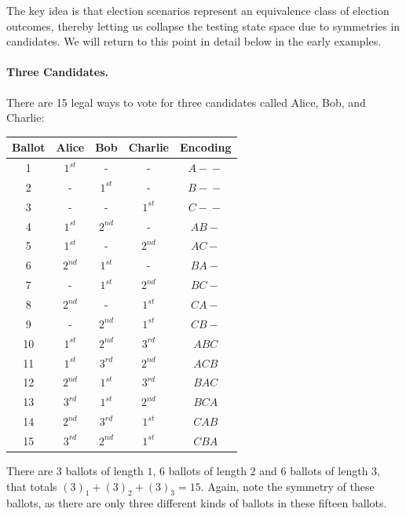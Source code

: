 \documentclass[runningheads,a4paper]{llncs}
\newcommand{\ballotthree}[3]{\ensuremath{\boxed{#1}\boxed{#2}\boxed{#3}}}
\newcommand{\first}{$1^{st}$\xspace}
\newcommand{\second}{$2^{nd}$\xspace}
\newcommand{\third}{$3^{rd}$\xspace}
\begin{document}
The key idea is that election scenarios represent an equivalence class
of election outcomes, thereby letting us collapse the testing state
space due to symmetries in candidates.  We will return to this point
in detail below in the early examples.

\paragraph{Three Candidates.}
There are 15 legal ways to vote for three candidates called Alice,
Bob, and Charlie:

\begin{center}
  \begin{tabular}{ccccc}
    Ballot & Alice & Bob & Charlie & Encoding\\ 
    \hline
    1 & \first & - & - & $\ballotthree{A}{-}{-}$\\
    2 & - & \first & - & $\ballotthree{B}{-}{-}$\\
    3 & - & - & \first & $\ballotthree{C}{-}{-}$\\
    4 & \first & \second & - & $\ballotthree{A}{B}{-}$\\
    5 & \first & - & \second & $\ballotthree{A}{C}{-}$\\
    6 & \second & \first & - &$\ballotthree{B}{A}{-}$\\
    7 & - & \first & \second & $\ballotthree{B}{C}{-}$\\
    8 & \second & - & \first & $\ballotthree{C}{A}{-}$\\
    9 & - & \second & \first & $\ballotthree{C}{B}{-}$\\
    10 & \first & \second & \third & $\ballotthree{A}{B}{C}$\\
    11 & \first & \third & \second & $\ballotthree{A}{C}{B}$\\
    12 & \second & \first & \third & $\ballotthree{B}{A}{C}$\\
    13 & \third & \first & \second & $\ballotthree{B}{C}{A}$\\
    14 & \second & \third & \first & $\ballotthree{C}{A}{B}$\\
    15 & \third & \second & \first & $\ballotthree{C}{B}{A}$
  \end{tabular}
\end{center}

\noindent There are $3$ ballots of length $1$, $6$ ballots of length
$2$ and $6$ ballots of length $3$, that totals ${{(3)}_{1}} +
{{(3)}_{2}} + {{(3)}_{3}} = 15$.  Again, note the symmetry of these
ballots, as there are only three different kinds of ballots in these
fifteen ballots.
\end{document}
